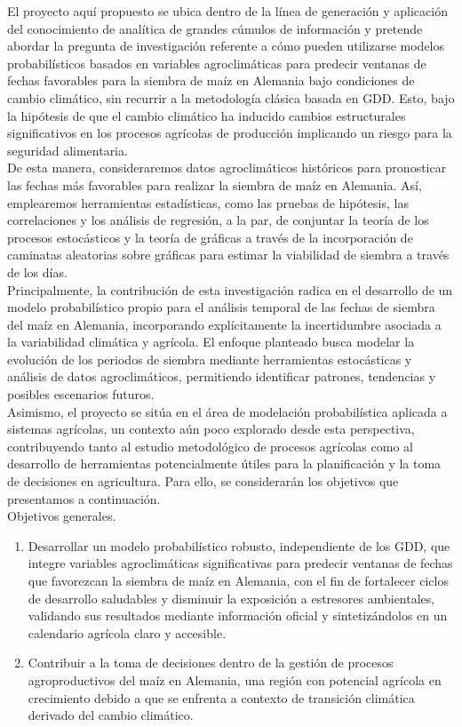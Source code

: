 El proyecto aquí propuesto se ubica dentro de la línea de generación y aplicación del conocimiento de analítica de grandes cúmulos de información y pretende abordar la pregunta de investigación referente a cómo pueden utilizarse modelos probabilísticos basados en variables agroclimáticas para predecir ventanas de fechas favorables para la siembra de maíz en Alemania bajo condiciones de cambio climático, sin recurrir a la metodología clásica basada en GDD. Esto, bajo la hipótesis de que el cambio climático ha inducido cambios estructurales significativos en los procesos agrícolas de producción implicando un riesgo para la seguridad alimentaria.\\

De esta manera, consideraremos datos agroclimáticos históricos para pronosticar las fechas más favorables para realizar la siembra de maíz en Alemania. Así, emplearemos herramientas estadísticas, como las pruebas de hipótesis, las correlaciones y los análisis de regresión, a la par, de conjuntar la teoría de los procesos estocásticos y la teoría de gráficas a través de la incorporación de caminatas aleatorias sobre gráficas para estimar la viabilidad de siembra a través de los días.\\

Principalmente, la contribución de esta investigación radica en el desarrollo de un modelo probabilístico propio para el análisis temporal de las fechas de siembra del maíz en Alemania, incorporando explícitamente la incertidumbre asociada a la variabilidad climática y agrícola. El enfoque planteado busca modelar la evolución de los periodos de siembra mediante herramientas estocásticas y análisis de datos agroclimáticos, permitiendo identificar patrones, tendencias y posibles escenarios futuros.\\

Asimismo, el proyecto se sitúa en el área de modelación probabilística aplicada a sistemas agrícolas, un contexto aún poco explorado desde esta perspectiva, contribuyendo tanto al estudio metodológico de procesos agrícolas como al desarrollo de herramientas potencialmente útiles para la planificación y la toma de decisiones en agricultura. Para ello, se considerarán los objetivos que presentamos a continuación.\\

Objetivos generales.

\begin{enumerate}
    \item Desarrollar un modelo probabilístico robusto, independiente de los GDD, que integre variables agroclimáticas significativas para predecir ventanas de fechas que favorezcan la siembra de maíz en Alemania, con el fin de fortalecer ciclos de desarrollo saludables y disminuir la exposición a estresores ambientales, validando sus resultados mediante información oficial y sintetizándolos en un calendario agrícola claro y accesible.
    \item Contribuir a la toma de decisiones dentro de la gestión de procesos agroproductivos del maíz en Alemania, una región con potencial agrícola en crecimiento debido a que se enfrenta a contexto de transición climática derivado del cambio climático.
\end{enumerate}

